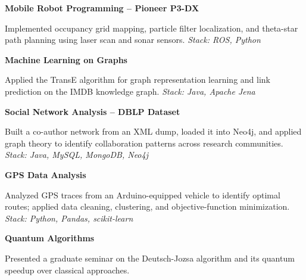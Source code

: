 \documentclass[10pt, letterpaper]{article}
\newcommand{\project}[2]{%
  \textbf{#1} \hfill {\itshape #2}%
}
\begin{document}
\vspace{1pt}
\project{Mobile Robot Programming -- Pioneer P3-DX}{}
\begin{cvitems}
  \item Implemented occupancy grid mapping, particle filter localization, and theta-star path planning using laser scan and sonar sensors. \textit{Stack: ROS, Python}
\end{cvitems}

\vspace{1pt}
\project{Machine Learning on Graphs}{}
\begin{cvitems}
  \item Applied the TransE algorithm for graph representation learning and link prediction on the IMDB knowledge graph. \textit{Stack: Java, Apache Jena}
\end{cvitems}

\vspace{1pt}
\project{Social Network Analysis -- DBLP Dataset}{}
\begin{cvitems}
  \item Built a co-author network from an XML dump, loaded it into Neo4j, and applied graph theory to identify collaboration patterns across research communities. \textit{Stack: Java, MySQL, MongoDB, Neo4j}
\end{cvitems}

\vspace{1pt}
\project{GPS Data Analysis}{}
\begin{cvitems}
  \item Analyzed GPS traces from an Arduino-equipped vehicle to identify optimal routes; applied data cleaning, clustering, and objective-function minimization. \textit{Stack: Python, Pandas, scikit-learn}
\end{cvitems}

\vspace{1pt}
\project{Quantum Algorithms}{}
\begin{cvitems}
  \item Presented a graduate seminar on the Deutsch-Jozsa algorithm and its quantum speedup over classical approaches.
\end{cvitems}
\end{document}
